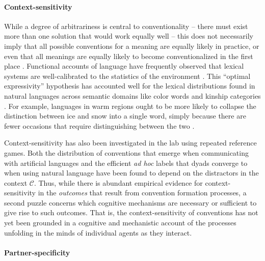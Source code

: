 \paragraph{Context-sensitivity}

While a degree of arbitrariness is central to conventionality -- there must exist more than one solution that would work equally well -- this does not necessarily imply that all possible conventions for a meaning are equally likely in practice, or even that all meanings are equally likely to become conventionalized in the first place \cite{HawkinsGoldstone16_SocialConventions}.
Functional accounts of language have frequently observed that lexical systems are well-calibrated to the statistics of the environment \cite{gibson2019efficiency}.
This ``optimal expressivity'' hypothesis has accounted well for the lexical distributions found in natural languages across semantic domains like color words and kinship categories \cite{KempRegier12_KinshipCategories,regier201511,gibson2017color,kemp2018semantic}.
For example, languages in warm regions ought to be more likely to collapse the distinction between ice and snow into a single word, simply because there are fewer occasions that require distinguishing between the two \cite{regier2016languages}. 

Context-sensitivity has also been investigated in the lab using repeated reference games.
Both the distribution of conventions that emerge when communicating with artificial languages \cite{WintersKirbySmith14_LanguagesAdapt, KirbyTamarizCornishSmith15_CompressionCommunication} and the efficient \emph{ad hoc} labels that dyads converge to when using natural language \cite{hawkins2020characterizing} have been found to depend on the distractors in the context $\mathcal{C}$.
Thus, while there is abundant empirical evidence for context-sensitivity in the \emph{outcomes} that result from convention formation processes, a second puzzle concerns which cognitive mechanisms are necessary or sufficient to give rise to such outcomes.
That is, the context-sensitivity of conventions has not yet been grounded in a cognitive and mechanistic account of the processes unfolding in the minds of individual agents as they interact.

\paragraph{Partner-specificity}

